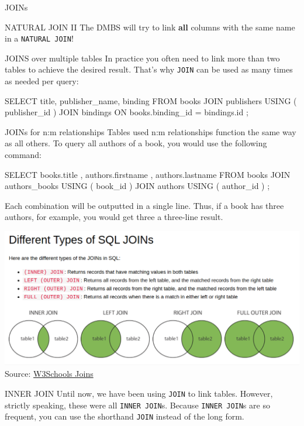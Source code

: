 \begin{frame}{JOINs}
\begin{block}{NATURAL JOIN II}
The DMBS will try to link \textbf{all} columns with the same name in a \texttt{NATURAL JOIN}!
\end{block}

\framebreak

\begin{block}{JOINS over multiple tables}\small
In practice you often need to link more than two tables to achieve the desired result. That's why 
\texttt{JOIN} can be used as many times as needed per query: 
\begin{sqlcode}
SELECT title, publisher_name, binding
FROM books
JOIN publishers USING ( publisher_id )
JOIN bindings ON books.binding_id = bindings.id ;
\end{sqlcode}
\end{block}

\framebreak

\begin{block}{JOINs for n:m relationships}\small
Tables used n:m relationships function the same way as all others. To query all authors of a book, you would use the following command:  
\begin{sqlcode}
SELECT books.title , authors.firstname , authors.lastname
FROM books
JOIN authors_books USING ( book_id )
JOIN authors USING ( author_id ) ;
\end{sqlcode}
Each combination will be outputted in a single line. Thus, if a book has three authors, for example, you would get three a three-line result. 
\end{block}

\framebreak 

\includegraphics[width=\textwidth]{img/w3schools-joins.png}
{\scriptsize
Source: \href{https://www.w3schools.com/sql/sql_join.asp}{W3Schools Joins}
}

\framebreak

\begin{block}{INNER JOIN}\footnotesize
Until now, we have been using \texttt{JOIN} to link tables. However, strictly speaking, these were all  \texttt{INNER JOIN}s. Because \texttt{INNER JOIN}s are so frequent, you can use the shorthand \texttt{JOIN}  instead of the long form.


\end{block}
\end{frame}
